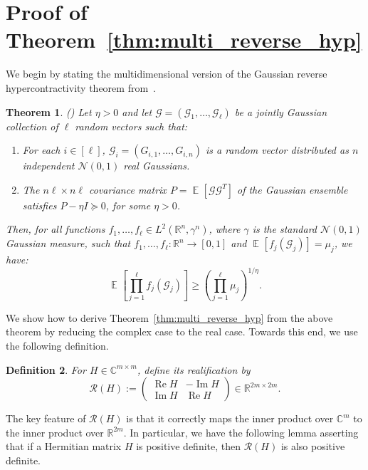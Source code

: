 \documentclass[11pt]{article}
\newtheorem{thm}{Theorem}[section]
\newtheorem{definition}[thm]{Definition}
\newcommand\Expect[2]{{\mathop{\mathbb{E}}_{#1}\left[ {#2} \right]}}
\renewcommand\geq{\geqslant}
\begin{document}



\appendix

\section{Proof of Theorem~\ref{thm:multi_reverse_hyp}}
\label{sec:GRH_complex}

We begin by stating the multidimensional version of the Gaussian reverse hypercontractivity theorem from~\cite{ChenDafnisPaouris2015HolderGaussian, Mos}.

\begin{thm}\label{thm:multi_reverse_hyp_real}(\cite{ChenDafnisPaouris2015HolderGaussian, Mos})
	Let $\eta>0$ and let $\mathbf{\mathcal{G}} = (\mathcal{G}_1,\ldots,\mathcal{G}_{\ell})$ be a jointly Gaussian collection of $\ell$ random vectors such that:
	\begin{enumerate}
		\item For each $i \in [\ell]$, $\mathcal{G}_i = \left(G_{i,1}, \ldots, G_{i,n}\right)$ is a random vector distributed as $n$ independent $\mathcal{N}(0,1)$ real Gaussians.
		\item  The $n\ell\times n\ell$ covariance matrix $P = \Expect{}{\mathcal{G}\mathcal{G}^T}$ of the Gaussian ensemble satisfies  $P-\eta I\succeq 0$, for some $\eta>0$. 
	\end{enumerate}
	Then, for all functions $f_1,\ldots,f_{\ell} \in L^2(\mathbb{R}^n,\gamma^n)$, where $\gamma$ is the standard $\mathcal{N}(0,1)$ Gaussian measure, such that $f_{1},\ldots,f_{\ell} : \mathbb{R}^n \to [0,1]$ and
	$\Expect{}{f_{j}(\mathcal{G}_{j})} = \mu_j$,
	we have:
	\[
	\Expect{}{\prod_{j=1}^\ell f_{j}(\mathcal{G}_{j})} \geq
	\left( \prod_{j=1}^\ell \mu_j \right)^{1/\eta}.
	\]
\end{thm}

We show how to derive Theorem~\ref{thm:multi_reverse_hyp} from the above theorem by reducing the complex case to the real case.  
Towards this end, we use the following definition.

\begin{definition}\label{def:realification}
    For \(H\in\mathbb{C}^{m\times m}\), define its {\em realification} by
\[
\mathcal{R}(H)
:=
\begin{pmatrix}
\operatorname{Re}H & -\operatorname{Im}H\\
\operatorname{Im}H &  \operatorname{Re}H
\end{pmatrix}
\in\mathbb{R}^{2m\times 2m}.
\]
\end{definition}
The key feature of $\mathcal{R}(H)$ is that it correctly maps the inner product over $\mathbb{C}^{m}$ to the inner product over $\mathbb{R}^{2m}$. In particular, we have the following lemma asserting that if a Hermitian matrix $H$ is positive definite, then $\mathcal{R}(H)$ is also positive definite.
\end{document}

